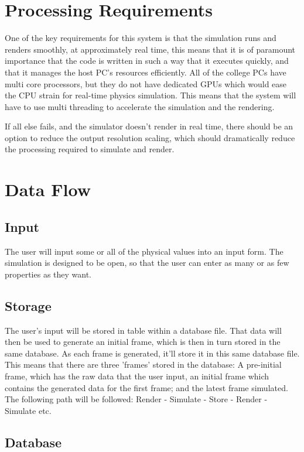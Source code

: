 \section{Processing Requirements}
One of the key requirements for this system is that the simulation runs and renders smoothly, at approximately real time, this means that it is of paramount importance that the code is written in such a way that it executes quickly, and that it manages the host PC's resources efficiently. All of the college PCs have multi core processors, but they do not have dedicated GPUs which would ease the CPU strain for real-time physics simulation. This means that the system will have to use multi threading to accelerate the simulation and the rendering.

If all else fails, and the simulator doesn't render in real time, there should be an option to reduce the output resolution scaling, which should dramatically reduce the processing required to simulate and render.

\section{Data Flow}
\subsection{Input}
	The user will input some or all of the physical values into an input form. The simulation is designed to be open, so that the user can enter as many or as few properties as they want.

\subsection{Storage}
	The user's input will be stored in table within a database file. That data will then be used to generate an initial frame, which is then in turn stored in the same database. As each frame is generated, it'll store it in this same database file. This means that there are three 'frames' stored in the database: A pre-initial frame, which has the raw data that the user input, an initial frame which contains the generated data for the first frame; and the latest frame simulated. The following path will be followed: Render - Simulate - Store - Render - Simulate etc.

\subsection{Database}

